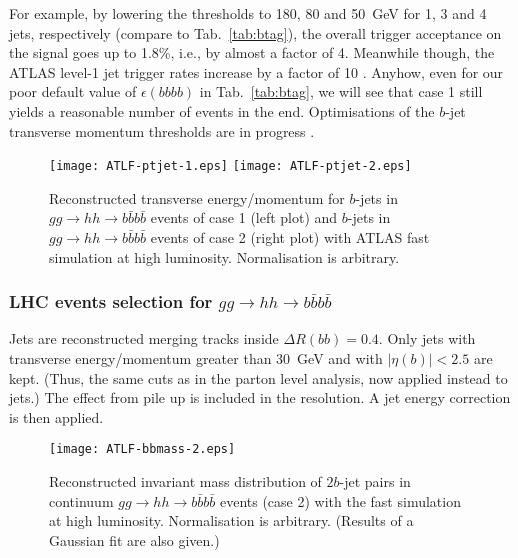 For example, by lowering the thresholds to 180, 80
and 50~GeV for 1, 3 and 4 jets, respectively (compare
to Tab.~\ref{tab:btag}), the overall
trigger acceptance on the signal goes up to 1.8\%, i.e., by almost
a factor of 4. Meanwhile though,
the ATLAS level-1 jet trigger rates increase by a factor of 10
\cite{trig}.
Anyhow, even for our poor default value of $\epsilon(bbbb)$ in
Tab.~\ref{tab:btag}, we will see that case 1
still yields a reasonable number of events in the end.
Optimisations of the $b$-jet transverse momentum thresholds
are in progress \cite{more}.

\begin{figure}
\vspace*{-9mm}
\begin{center}
  \texttt{[image: ATLF-ptjet-1.eps]}
  \texttt{[image: ATLF-ptjet-2.eps]}
 \caption{Reconstructed transverse energy/momentum for    
   $b$-jets in $gg\to hh\to b\bar{b}b\bar{b}$ events of case 1
   (left plot) and $b$-jets in $gg\to hh\to b\bar{b}b\bar{b}$ events
   of case 2 (right plot) with ATLAS fast simulation \cite{ATLFAST} at high
   luminosity. Normalisation is arbitrary.}
  \label{ATLF-ptjet-2}
\end{center}
\vspace*{-5mm}
\end{figure}

\subsubsection{LHC events selection for $gg\to hh\to b\bar{b}b\bar{b}$}

Jets are reconstructed merging
tracks inside $\Delta R(bb)=0.4$. Only jets with transverse
energy/momentum greater than 30~GeV and with $|\eta(b)|<2.5$ are kept.
(Thus, the same cuts as in the parton level analysis, now applied
instead to jets.)  The effect from pile up is included in the
resolution.  A jet energy correction is then applied.

\begin{figure}[!ht]
\vspace*{-9mm}
\begin{center}
  \texttt{[image: ATLF-bbmass-2.eps]} 
  \caption{ Reconstructed invariant mass distribution of
$2b$-jet pairs in continuum $gg\to hh\to b\bar{b}b\bar{b}$ events (case 2) with 
the fast simulation at high luminosity.
Normalisation is arbitrary. (Results of a Gaussian fit are
also given.) }
  \label{ATLF-bbmass-2}
\end{center}
\vspace*{-9mm}
\end{figure}

